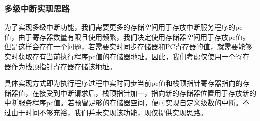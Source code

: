 \subsubsection{多级中断实现思路}
为了实现多级中断功能，我们需要更多的存储空间用于存放中断服务程序的pc值，由于寄存器数量有限且使用频繁，我们决定使用存储器空间用于存放pc值。但是这样会存在一个问题，若需要实时同步存储器和PC寄存器的值，就需要能够实时获取存有当前执行程序pc值的存储器地址。因此，我们考虑仅使用一个寄存器作为栈顶指针寄存器存储该地址。
\par
具体实现方式即为执行程序过程中实时同步当前pc值和栈顶指针寄存器指向的存储器值，在接受到中断请求后，栈顶指针加一，指向新的存储器位置用于存放新的中断服务程序pc值。若预留足够的存储器空间，便可实现自定义级数的中断。不过由于时间不够充裕，我们并未实现该功能，现仅提供实现思路。
